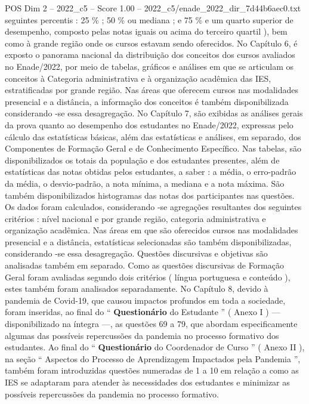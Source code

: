 \begin{textsample}{POS Dim 2 – 2022\_c5 – Score 1.00 – 2022\_c5/enade\_2022\_dir\_7d44b6aec0.txt}  \label{ex:f2_pos_216}
seguintes percentis : 25 \% ; 50 \% ou mediana ; e 75 \% e um quarto superior de desempenho, composto pelas notas iguais ou acima do terceiro quartil ), bem como à grande região onde os cursos estavam sendo oferecidos.
No Capítulo 6, é exposto o panorama nacional da distribuição dos conceitos dos cursos avaliados no Enade/2022, por meio de tabelas, gráficos e análises em que se articulam os conceitos à Categoria administrativa e à organização acadêmica das IES, estratificadas por grande região.
Nas áreas que oferecem cursos nas modalidades presencial e a distância, a informação dos conceitos é também disponibilizada considerando -se essa desagregação.
No Capítulo 7, são exibidas as análises gerais da prova quanto ao desempenho dos estudantes no Enade/2022, expressas pelo cálculo das estatísticas básicas, além das estatísticas e análises, em separado, dos Componentes de Formação Geral e de Conhecimento Específico.
Nas tabelas, são disponibilizados os totais da população e dos estudantes presentes, além de estatísticas das notas obtidas pelos estudantes, a saber : a média, o erro-padrão da média, o desvio-padrão, a nota mínima, a mediana e a nota máxima.
São também disponibilizados histogramas das notas dos participantes nas questões.
Os dados foram calculados, considerando -se agregações resultantes dos seguintes critérios : nível nacional e por grande região, categoria administrativa e organização acadêmica.
Nas áreas em que são oferecidos cursos nas modalidades presencial e a distância, estatísticas selecionadas são também disponibilizadas, considerando -se essa desagregação.
Questões discursivas e objetivas são analisadas também em separado.
Como as questões discursivas de Formação Geral foram avaliadas segundo dois critérios ( língua portuguesa e conteúdo ), estes também foram analisados separadamente.
No Capítulo 8, devido à pandemia de Covid-19, que causou impactos profundos em toda a sociedade, foram inseridas, ao final do “ \textbf{Questionário} do Estudante ” ( Anexo I ) — disponibilizado na íntegra —, as questões 69 a 79, que abordam especificamente algumas das possíveis repercussões da pandemia no processo formativo dos estudantes.
Ao final do “ \textbf{Questionário} do Coordenador de Curso ” ( Anexo II ), na seção “ Aspectos do Processo de Aprendizagem Impactados pela Pandemia ”, também foram introduzidas questões numeradas de 1 a 10 em relação a como as IES se adaptaram para atender às necessidades dos estudantes e minimizar as possíveis repercussões da pandemia no processo formativo.

\end{textsample}
